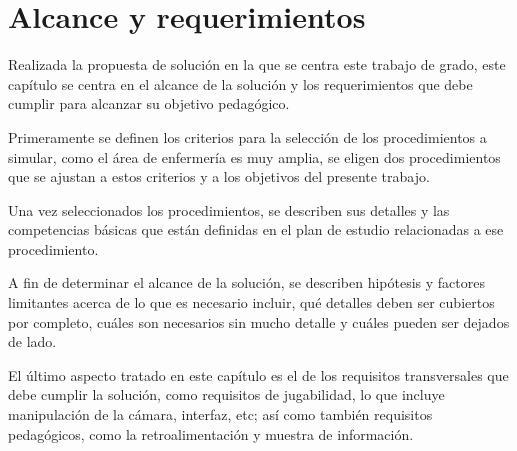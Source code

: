 \chapter{Alcance y requerimientos}
\label{chap:requerimientos}

Realizada la propuesta de solución en la que se centra este trabajo de grado, este capítulo
se centra en el alcance de la solución y los requerimientos que debe cumplir para
alcanzar su objetivo pedagógico.

Primeramente se definen los criterios para la selección de los procedimientos
a simular, como el área de enfermería es muy amplia, se eligen dos procedimientos
que se ajustan a estos criterios y a los objetivos del presente trabajo.

Una vez seleccionados los procedimientos, se describen sus detalles y 
las competencias básicas que están definidas en el plan de 
estudio relacionadas a ese procedimiento. 

A fin de determinar el alcance de la solución, se describen hipótesis y factores 
limitantes acerca de
lo que es necesario incluir, qué detalles deben ser cubiertos por completo,
cuáles son necesarios sin mucho detalle y cuáles pueden ser dejados de lado. 

El último aspecto tratado en este capítulo es el de los requisitos transversales
que debe cumplir la solución, como requisitos de jugabilidad, lo que incluye manipulación de
la cámara, interfaz, etc; así como también requisitos pedagógicos, como la
retroalimentación y muestra de información.





